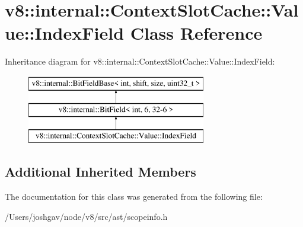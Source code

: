 \hypertarget{classv8_1_1internal_1_1_context_slot_cache_1_1_value_1_1_index_field}{}\section{v8\+:\+:internal\+:\+:Context\+Slot\+Cache\+:\+:Value\+:\+:Index\+Field Class Reference}
\label{classv8_1_1internal_1_1_context_slot_cache_1_1_value_1_1_index_field}
Inheritance diagram for v8\+:\+:internal\+:\+:Context\+Slot\+Cache\+:\+:Value\+:\+:Index\+Field\+:\begin{figure}[H]
\begin{center}
\leavevmode
\includegraphics[height=3.000000cm]{classv8_1_1internal_1_1_context_slot_cache_1_1_value_1_1_index_field}
\end{center}
\end{figure}
\subsection*{Additional Inherited Members}


The documentation for this class was generated from the following file\+:\begin{DoxyCompactItemize}
\item 
/\+Users/joshgav/node/v8/src/ast/scopeinfo.\+h\end{DoxyCompactItemize}
